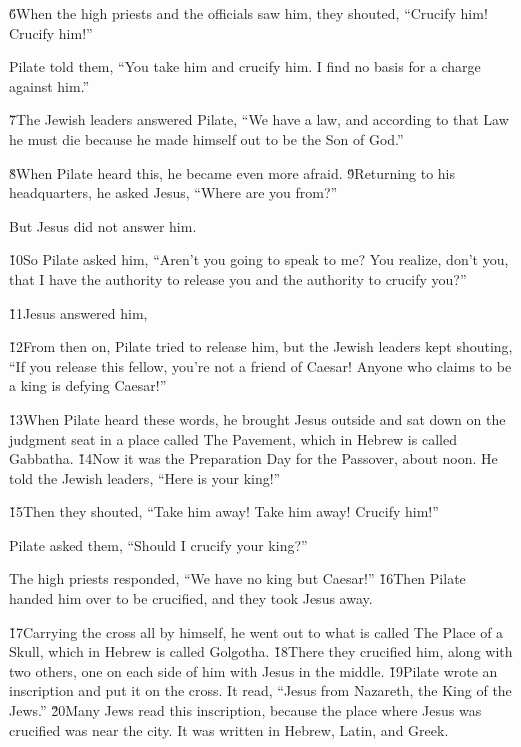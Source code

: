 \v{6}When the high priests and the officials saw him, they shouted, ``Crucify him! Crucify him!''

Pilate told them, ``You take him and crucify him. I find no basis for a charge against him.''

\v{7}The Jewish leaders answered Pilate, ``We have a law, and according to that Law he must die because he made himself out to be the Son of God.''

\v{8}When Pilate heard this, he became even more afraid. \v{9}Returning to his headquarters, he asked Jesus, ``Where are you from?''

But Jesus did not answer him.

\v{10}So Pilate asked him, ``Aren't you going to speak to me? You realize, don't you, that I have the authority to release you and the authority to crucify you?''

\v{11}Jesus answered him, 

\v{12}From then on, Pilate tried to release him, but the Jewish leaders kept shouting, ``If you release this fellow, you're not a friend of Caesar! Anyone who claims to be a king is defying Caesar!''

\v{13}When Pilate heard these words, he brought Jesus outside and sat down on the judgment seat in a place called The Pavement, which in Hebrew is called Gabbatha. \v{14}Now it was the Preparation Day for the Passover, about noon. He told the Jewish leaders, ``Here is your king!''

\v{15}Then they shouted, ``Take him away! Take him away! Crucify him!''

Pilate asked them, ``Should I crucify your king?''

The high priests responded, ``We have no king but Caesar!'' \v{16}Then Pilate handed him over to be crucified, and they took Jesus away.

\v{17}Carrying the cross all by himself, he went out to what is called The Place of a Skull, which in Hebrew is called Golgotha. \v{18}There they crucified him, along with two others, one on each side of him with Jesus in the middle. \v{19}Pilate wrote an inscription and put it on the cross. It read, ``Jesus from Nazareth, the King of the Jews.'' \v{20}Many Jews read this inscription, because the place where Jesus was crucified was near the city. It was written in Hebrew, Latin, and Greek.

